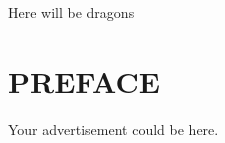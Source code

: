\noindent
Here will be dragons
 
\noindent

\noindent

\noindent




\newpage
 
\chapter*{PREFACE}
\noindent 

Your advertisement could be here.




\newpage
\tableofcontents






%  
%  
%  
 



\newpage
\renewcommand{\chaptermark}[1]{\markboth{\thechapter. \ #1}{}}
\renewcommand{\sectionmark}[1]{\markright{}{}}
\lhead{\fancyplain{}{\leftmark}}
 
